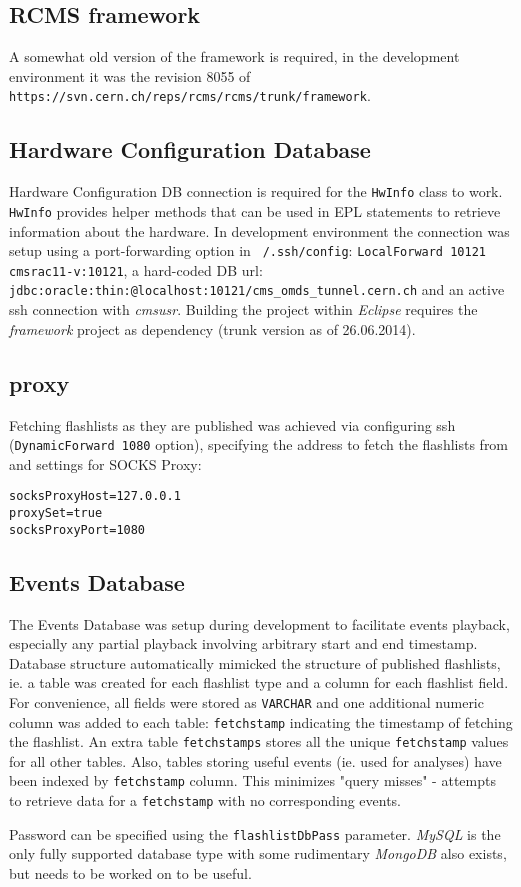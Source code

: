 \subsection{RCMS framework} \label{subsec:framework}
A somewhat old version of the framework is required, in the development environment it was the revision 8055 of \texttt{https://svn.cern.ch/reps/rcms/rcms/trunk/framework}.


\subsection{Hardware Configuration Database}
\label{subsec:hwconfdb}
Hardware Configuration DB connection is required for the \texttt{HwInfo} class to work. \texttt{HwInfo} provides helper methods that can be used in EPL statements to retrieve information about the hardware.
In development environment the connection was setup using a port-forwarding option in \texttt{~/.ssh/config}: \texttt{LocalForward 10121 cmsrac11-v:10121}, a hard-coded DB url: \texttt{jdbc:oracle:thin:@localhost:10121/cms\_omds\_tunnel.cern.ch} and an active ssh connection with \emph{cmsusr}. Building the project within \emph{Eclipse} requires the \emph{framework} project as dependency (trunk version as of 26.06.2014).

\subsection{proxy}
\label{subsec:proxy}
Fetching flashlists as they are published was achieved via configuring ssh (\texttt{DynamicForward 1080} option), specifying the address to fetch the flashlists from and settings for SOCKS Proxy:
\begin{lstlisting}
socksProxyHost=127.0.0.1
proxySet=true
socksProxyPort=1080
\end{lstlisting}

\subsection{Events Database}
\label{subsec:eventsdb}
The Events Database was setup during development to facilitate events playback, especially any partial playback involving arbitrary start and end timestamp.
Database structure automatically mimicked the structure of published flashlists, ie. a table was created for each flashlist type and a column for each flashlist field. 
For convenience, all fields were stored as \texttt{VARCHAR} and one additional numeric column was added to each table: \texttt{fetchstamp} indicating the timestamp of fetching the flashlist. An extra table \texttt{fetchstamps} stores all the unique \texttt{fetchstamp} values for all other tables. Also, tables storing useful events (ie. used for analyses) have been indexed by \texttt{fetchstamp} column. This minimizes "query misses" - attempts to retrieve data for a \texttt{fetchstamp} with no corresponding events.

Password can be specified using the \texttt{flashlistDbPass} parameter. \emph{MySQL} is the only fully supported database type with some rudimentary \emph{MongoDB} also exists, but needs to be worked on to be useful.







